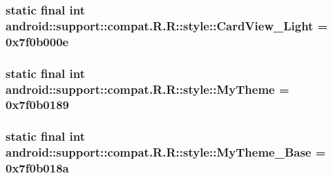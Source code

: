 \hypertarget{classandroid_1_1support_1_1compat_1_1_r_1_1style_68f54be60b1e6dc8e2087b19b94102dd}{
\subsubsection[{CardView\_\-Light}]{\setlength{\rightskip}{0pt plus 5cm}static final int android::support::compat.R.R::style::CardView\_\-Light = 0x7f0b000e}}
\label{classandroid_1_1support_1_1compat_1_1_r_1_1style_68f54be60b1e6dc8e2087b19b94102dd}


\hypertarget{classandroid_1_1support_1_1compat_1_1_r_1_1style_a142f105580b7301e78486c4878c3e26}{
\subsubsection[{MyTheme}]{\setlength{\rightskip}{0pt plus 5cm}static final int android::support::compat.R.R::style::MyTheme = 0x7f0b0189}}
\label{classandroid_1_1support_1_1compat_1_1_r_1_1style_a142f105580b7301e78486c4878c3e26}


\hypertarget{classandroid_1_1support_1_1compat_1_1_r_1_1style_6989315e50825aa1028474c08136a8fc}{
\subsubsection[{MyTheme\_\-Base}]{\setlength{\rightskip}{0pt plus 5cm}static final int android::support::compat.R.R::style::MyTheme\_\-Base = 0x7f0b018a}}
\label{classandroid_1_1support_1_1compat_1_1_r_1_1style_6989315e50825aa1028474c08136a8fc}


